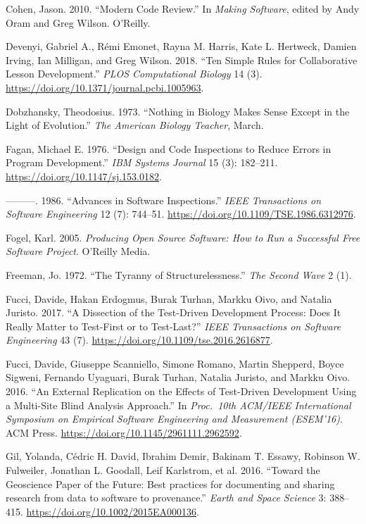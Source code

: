 \documentclass[
]{krantz}
\newlength{\cslhangindent}
\newenvironment{cslreferences}%
  {\setlength{\parindent}{0pt}%
  \everypar{\setlength{\hangindent}{\cslhangindent}}\ignorespaces}%
  {\par}
\begin{document}
\begin{cslreferences}
\leavevmode\hypertarget{ref-Cohe2010}{}%
Cohen, Jason. 2010. ``Modern Code Review.'' In \emph{Making Software}, edited by Andy Oram and Greg Wilson. O'Reilly.

\leavevmode\hypertarget{ref-Deve2018}{}%
Devenyi, Gabriel A., Rémi Emonet, Rayna M. Harris, Kate L. Hertweck, Damien Irving, Ian Milligan, and Greg Wilson. 2018. ``Ten Simple Rules for Collaborative Lesson Development.'' \emph{PLOS Computational Biology} 14 (3). \url{https://doi.org/10.1371/journal.pcbi.1005963}.

\leavevmode\hypertarget{ref-Dobz1973}{}%
Dobzhansky, Theodosius. 1973. ``Nothing in Biology Makes Sense Except in the Light of Evolution.'' \emph{The American Biology Teacher}, March.

\leavevmode\hypertarget{ref-Faga1976}{}%
Fagan, Michael E. 1976. ``Design and Code Inspections to Reduce Errors in Program Development.'' \emph{IBM Systems Journal} 15 (3): 182--211. \url{https://doi.org/10.1147/sj.153.0182}.

\leavevmode\hypertarget{ref-Faga1986}{}%
---------. 1986. ``Advances in Software Inspections.'' \emph{IEEE Transactions on Software Engineering} 12 (7): 744--51. \url{https://doi.org/10.1109/TSE.1986.6312976}.

\leavevmode\hypertarget{ref-Foge2005}{}%
Fogel, Karl. 2005. \emph{Producing Open Source Software: How to Run a Successful Free Software Project}. O'Reilly Media.

\leavevmode\hypertarget{ref-Free1972}{}%
Freeman, Jo. 1972. ``The Tyranny of Structurelessness.'' \emph{The Second Wave} 2 (1).

\leavevmode\hypertarget{ref-Fucc2017}{}%
Fucci, Davide, Hakan Erdogmus, Burak Turhan, Markku Oivo, and Natalia Juristo. 2017. ``A Dissection of the Test-Driven Development Process: Does It Really Matter to Test-First or to Test-Last?'' \emph{IEEE Transactions on Software Engineering} 43 (7). \url{https://doi.org/10.1109/tse.2016.2616877}.

\leavevmode\hypertarget{ref-Fucc2016}{}%
Fucci, Davide, Giuseppe Scanniello, Simone Romano, Martin Shepperd, Boyce Sigweni, Fernando Uyaguari, Burak Turhan, Natalia Juristo, and Markku Oivo. 2016. ``An External Replication on the Effects of Test-Driven Development Using a Multi-Site Blind Analysis Approach.'' In \emph{Proc.~10th ACM/IEEE International Symposium on Empirical Software Engineering and Measurement (ESEM'16)}. ACM Press. \url{https://doi.org/10.1145/2961111.2962592}.

\leavevmode\hypertarget{ref-Gil2016}{}%
Gil, Yolanda, Cédric H. David, Ibrahim Demir, Bakinam T. Essawy, Robinson W. Fulweiler, Jonathan L. Goodall, Leif Karlstrom, et al. 2016. ``Toward the Geoscience Paper of the Future: Best practices for documenting and sharing research from data to software to provenance.'' \emph{Earth and Space Science} 3: 388--415. \url{https://doi.org/10.1002/2015EA000136}.


\end{cslreferences}
\end{document}
